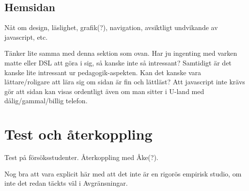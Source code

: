 \begin{binge}
  \subsection{Hemsidan}

  Nåt om design, läslighet, grafik(?), navigation, avsiktligt undvikande
  av javascript, etc.

  Tänker lite samma med denna sektion som ovan. Har ju ingenting med
  varken matte eller DSL att göra i sig, så kanske inte så intressant?
  Samtidigt är det kanske lite intressant ur pedagogik-aspekten. Kan det
  kanske vara lättare/roligare att lära sig om sidan är fin och
  lättläst? Att javascript inte krävs gör att sidan kan visas ordentligt
  även om man sitter i U-land med dålig/gammal/billig telefon.

  \section{Test och återkoppling}


  Test på försöksstudenter. Återkoppling med Åke(?).

  Nog bra att vara explicit här med att det inte är en rigorös empirisk
  studio, om inte det redan täckts väl i Avgränsningar.

\end{binge}